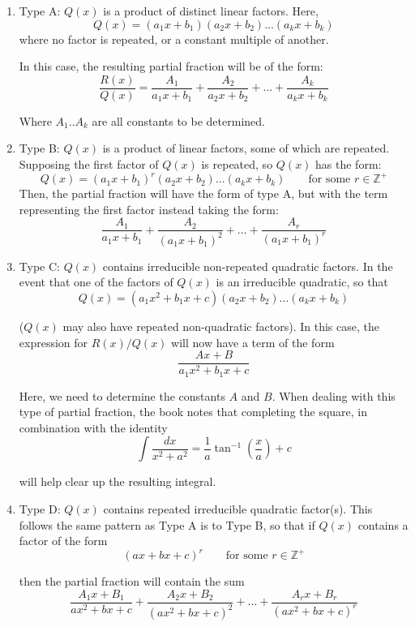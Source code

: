 \documentclass[10pt,a4paper]{report}
\begin{document}
\begin{enumerate}
	\item Type A: $Q(x)$ is a product of distinct linear factors. Here, 
	$$
		Q(x) = (a_1 x + b_1)(a_2 x + b_2)...(a_k x+ b_k)
	$$
	where no factor is repeated, or a constant multiple of another.

	In this case, the resulting partial fraction will be of the form:
	$$
		\frac{R(x)}{Q(x)} = \frac{A_1}{a_1x + b_1} + \frac{A_2}{a_2 x + b_2} + ... + \frac{A_k}{a_k x + b_k}
	$$

	Where $A_1 .. A_k$ are all constants to be determined.

	\item Type B: $Q(x)$ is a product of linear factors, some of which are repeated. Supposing the first factor of $Q(x)$ is repeated, so $Q(x)$ has the form:
	$$
		Q(x) = (a_1 x + b_1)^r(a_2 x + b_2)...(a_k x+ b_k) \qquad \text{for some } r \in \mathbb{Z^+}
	$$
	Then, the partial fraction will have the form of type A, but with the term representing the first factor instead taking the form:
	$$
		\frac{A_1}{a_1x + b_1} + \frac{A_2}{(a_1 x + b_1)^2} + ... + \frac{A_r}{(a_1 x + b_1)^r}
	$$

	\item Type C: $Q(x)$ contains irreducible non-repeated quadratic factors. In the event that one of the factors of $Q(x)$ is an irreducible quadratic, so that
	$$
		Q(x) = (a_1 x^2 + b_1x + c)(a_2 x + b_2)...(a_k x+ b_k)
	$$

	($Q(x)$ may also have repeated non-quadratic factors). In this case, the expression for $R(x)/Q(x)$ will now have a term of the form
	$$
		\frac{Ax + B}{a_1 x^2 + b_1x + c}
	$$

	Here, we need to determine the constants $A$ and $B$. When dealing with this type of partial fraction, the book notes that completing the square, in combination with the identity
	$$
		\int \frac{dx}{x^2 + a^2} = \frac{1}{a} \tan^{-1} \left( \frac{x}{a} \right) + c
	$$

	will help clear up the resulting integral.

	\item Type D: $Q(x)$ contains repeated irreducible quadratic factor(s). This follows the same pattern as Type A is to Type B, so that if $Q(x)$ contains a factor of the form
	$$
		(ax + bx + c)^r \qquad \text{for some } r \in \mathbb{Z^+}
	$$

	then the partial fraction will contain the sum
	$$
		\frac{A_1 x + B_1}{ax^2 + bx + c} + \frac{A_2 x + B_2}{(ax^2 + bx + c)^2} + ... + \frac{A_r x + B_r}{(ax^2 + bx + c)^r}
	$$

\end{enumerate}
\end{document}
